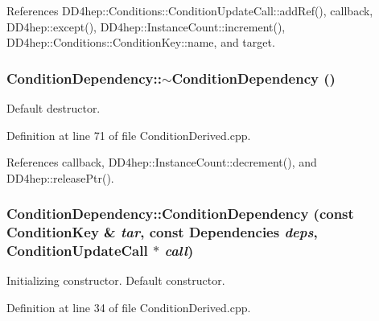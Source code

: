 References DD4hep::Conditions::ConditionUpdateCall::addRef(), callback, DD4hep::except(), DD4hep::InstanceCount::increment(), DD4hep::Conditions::ConditionKey::name, and target.\hypertarget{class_d_d4hep_1_1_conditions_1_1_condition_dependency_ae92b62f4f395a37f0acbf30f797ccdcd}{
\subsubsection[{$\sim$ConditionDependency}]{\setlength{\rightskip}{0pt plus 5cm}ConditionDependency::$\sim$ConditionDependency ()}}
\label{class_d_d4hep_1_1_conditions_1_1_condition_dependency_ae92b62f4f395a37f0acbf30f797ccdcd}


Default destructor. 

Definition at line 71 of file ConditionDerived.cpp.

References callback, DD4hep::InstanceCount::decrement(), and DD4hep::releasePtr().\hypertarget{class_d_d4hep_1_1_conditions_1_1_condition_dependency_aaf35fcc834e5ee49cc9d13fe9cff7ab5}{
\subsubsection[{ConditionDependency}]{\setlength{\rightskip}{0pt plus 5cm}ConditionDependency::ConditionDependency (const {\bf ConditionKey} \& {\em tar}, \/  const {\bf Dependencies} {\em deps}, \/  {\bf ConditionUpdateCall} $\ast$ {\em call})}}
\label{class_d_d4hep_1_1_conditions_1_1_condition_dependency_aaf35fcc834e5ee49cc9d13fe9cff7ab5}


Initializing constructor. Default constructor. 

Definition at line 34 of file ConditionDerived.cpp.

